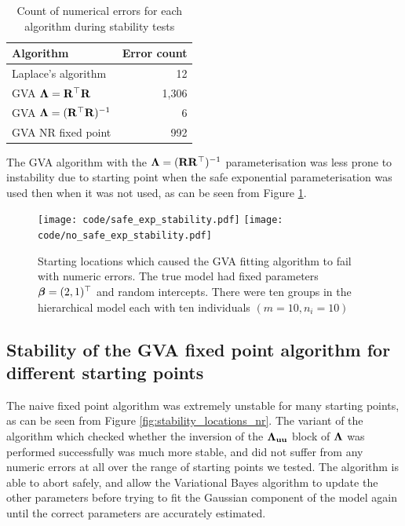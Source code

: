 			\begin{table}
				\begin{tabular}{|l|r|}
					\hline
					Algorithm                            & Error count \\
					\hline
					Laplace's algorithm                  & 12          \\
					GVA ${\boldsymbol \Lambda} = {\bf R}^\top {\bf R}$        & 1,306       \\
					GVA ${\boldsymbol \Lambda} = ({\bf R}^\top {\bf R})^{-1}$ & 6           \\
					GVA NR fixed point                   & 992         \\
					\hline
				\end{tabular}
				\caption{Count of numerical errors for each algorithm during stability tests}
				\label{tab:stability_results}
			\end{table}

			The GVA algorithm with the ${\boldsymbol \Lambda} = ({\bf R} {\bf R}^\top)^{-1}$ parameterisation was less prone to
			instability due to starting point when the safe exponential parameterisation was used then when it was
			not used, as can be seen from Figure \ref{fig:stability_locations_gva}. %
					
			\begin{figure}
				\texttt{[image: code/safe\_exp\_stability.pdf]}
				\texttt{[image: code/no\_safe\_exp\_stability.pdf]}
				\label{fig:stability_locations_gva}
				\caption{Starting locations which caused the GVA fitting algorithm to fail with numeric errors. The true model had fixed parameters ${\boldsymbol \beta} = (2, 1)^\top$ and random intercepts. There were ten groups in the
					hierarchical model each	with ten individuals $(m=10, n_i=10)$}
			\end{figure}

			\subsection{Stability of the GVA fixed point algorithm for different starting points}

			The naive fixed point algorithm was extremely unstable for many starting points, as can be seen from
			Figure \ref{fig:stability_locations_nr}. The variant of the algorithm which checked whether the
			inversion of the ${\boldsymbol \Lambda}_{{\bf u} {\bf u}}$ block of ${\boldsymbol \Lambda}$ was performed successfully was much more
			stable, and did not suffer from any numeric errors at all over the range of starting points we tested.
			The algorithm is able to abort safely, and allow the Variational Bayes algorithm to update the other
			parameters before trying to fit the Gaussian component of the model again until the correct parameters
			are accurately estimated.

